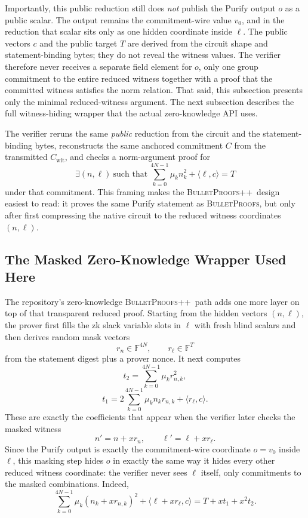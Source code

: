 \documentclass[11pt]{article}
\DeclareRobustCommand{\bp}{{\normalfont\scshape BulletProofs}}
\DeclareRobustCommand{\bppp}{{\normalfont\scshape BulletProofs++}}
\begin{document}
Importantly, this public reduction still does \emph{not} publish the Purify output $o$ as a public
scalar. The output remains the commitment-wire value $v_0$, and in the reduction that scalar sits
only as one hidden coordinate inside $\ell$. The public vectors $c$ and the public target $T$ are
derived from the circuit shape and statement-binding bytes; they do not reveal the witness values.
The verifier therefore never receives a separate field element for $o$, only one group commitment to the
entire reduced witness together with a proof that the committed witness satisfies the norm relation.
That said, this subsection presents only the minimal reduced-witness argument. The next subsection
describes the full witness-hiding wrapper that the actual zero-knowledge API uses.

The verifier reruns the same \emph{public} reduction from the circuit and the statement-binding
bytes, reconstructs the same anchored commitment $C$ from the transmitted
$C_{\mathrm{wit}}$, and checks a norm-argument proof for
\[
\exists (n,\ell)\ \text{such that}\
\sum_{k=0}^{4N-1} \mu_k n_k^2 + \langle \ell, c \rangle = T
\]
under that commitment. This framing makes the \bppp\ design easiest to read: it proves the same Purify
statement as \bp, but only after first compressing the native circuit to the reduced witness
coordinates $(n,\ell)$.

\subsection{The Masked Zero-Knowledge Wrapper Used Here}

The repository's zero-knowledge \bppp\ path adds one more layer on top of that transparent reduced
proof. Starting from the hidden vectors $(n,\ell)$, the prover first fills the zk slack variable
slots in $\ell$ with fresh blind scalars and then derives random mask vectors
\[
r_n \in \mathbb{F}^{4N}, \qquad r_\ell \in \mathbb{F}^{T}
\]
from the statement digest plus a prover nonce. It next computes
\[
t_2 = \sum_{k=0}^{4N-1} \mu_k r_{n,k}^2,
\]
\[
t_1 = 2 \sum_{k=0}^{4N-1} \mu_k n_k r_{n,k} + \langle r_\ell, c \rangle.
\]
These are exactly the coefficients that appear when the verifier later checks the masked witness
\[
n' = n + x r_n, \qquad \ell' = \ell + x r_\ell.
\]
Since the Purify output is exactly the commitment-wire coordinate $o = v_0$ inside $\ell$, this
masking step hides $o$ in exactly the same way it hides every other reduced witness coordinate: the
verifier never sees $\ell$ itself, only commitments to the masked combinations.
Indeed,
\[
\sum_{k=0}^{4N-1} \mu_k (n_k + x r_{n,k})^2 + \langle \ell + x r_\ell, c \rangle
= T + x t_1 + x^2 t_2.
\]
\end{document}
